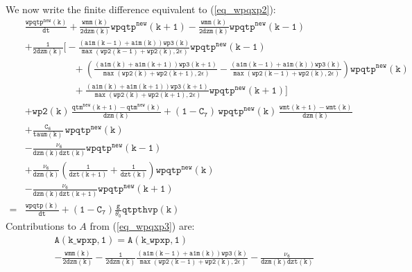 \documentclass[11pt,fleqn]{article}
\begin{document}
We now write
the finite difference equivalent to (\ref{eq_wpqxp2}):
%
\begin{equation}
\label{eq_wpqxp3}
\begin{split}
& \mathtt{
  \frac{wpqtp^{new}(k)}{dt}
  + \frac{wmm(k)}{2 dzm(k)} wpqtp^{new}(k+1)
  - \frac{wmm(k)}{2 dzm(k)} wpqtp^{new}(k-1)
  } \\
& \mathtt{
  + \frac{1}{2 dzm(k)}
    \bigg[ -\frac{\left(a1m(k-1)+a1m(k)\right) wp3(k)}
                 {\max\left(wp2(k-1)+wp2(k),2\epsilon\right)}
            wpqtp^{new}(k-1)
  } \\
& \mathtt{ \quad \quad \quad \quad \quad
          + \left( 
             \frac{\left(a1m(k)+a1m(k+1)\right) wp3(k+1)}
                 {\max\left(wp2(k)+wp2(k+1),2\epsilon\right)}
            -\frac{\left(a1m(k-1)+a1m(k)\right) wp3(k)}
                 {\max\left(wp2(k-1)+wp2(k),2\epsilon\right)}
            \right)
            wpqtp^{new}(k)
  } \\
& \mathtt{ \quad \quad \quad \quad \quad
           + \frac{\left(a1m(k)+a1m(k+1)\right) wp3(k+1)}
                 {\max\left(wp2(k)+wp2(k+1),2\epsilon\right)}
            wpqtp^{new}(k+1)
    \bigg]
  } \\
& \mathtt{
  + wp2(k) \, \frac{qtm^{new}(k+1)-qtm^{new}(k)}{dzm(k)}
  + (1-C_7) \, wpqtp^{new}(k) \, \frac{wmt(k+1)-wmt(k)}{dzm(k)}
  } \\
& \mathtt{
  + \frac{C_6}{taum(k)} \, wpqtp^{new}(k)
  } \\
& \mathtt{
  -\frac{\nu_6}{dzm(k)dzt(k)} wpqtp^{new}(k-1)
  } \\
& \mathtt{
  +\frac{\nu_6}{dzm(k)} \left( \frac{1}{dzt(k+1)} + \frac{1}{dzt(k)} \right) wpqtp^{new}(k)
  } \\
& \mathtt{
  -\frac{\nu_6}{dzm(k)dzt(k+1)} wpqtp^{new}(k+1)
  } \\
=& \mathtt{ \frac{wpqtp(k)}{dt} + (1-C_7) \frac{g}{\theta_0} qtpthvp(k) }
\end{split}
\end{equation}
%
Contributions to $A$ from (\ref{eq_wpqxp3}) are:
%
\begin{equation}
\begin{split}
&  \mathtt{ A(k\_wpxp,1) = A(k\_wpxp,1) } \\
&  \mathtt{
- \frac{wmm(k)}{2 dzm(k)}
- \frac{1}{2 dzm(k)}
  \frac{\left(a1m(k-1)+a1m(k)\right) wp3(k)}
       {\max\left(wp2(k-1)+wp2(k),2\epsilon\right)}
- \frac{\nu_6}{dzm(k)dzt(k)}
  }
\end{split}
\end{equation}
\end{document}
